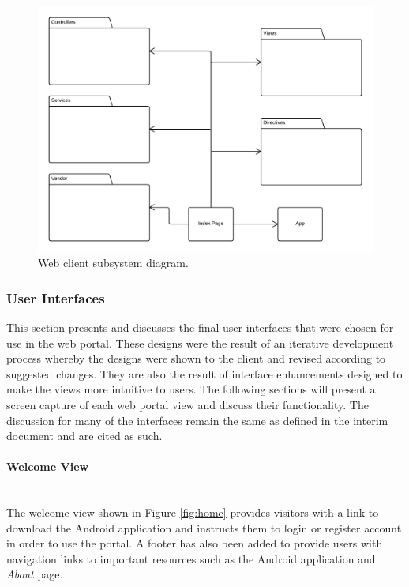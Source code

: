 \documentclass[11pt,a4paper]{report}
\begin{document}
\begin{figure}[H]
\centering
\includegraphics[width=0.8\linewidth]{./img/web-client-uml/subsystem-diagram}
\caption{Web client subsystem diagram.}
\label{fig:subsystem-diagram}
\end{figure}



\subsubsection{User Interfaces}
\label{sec:portal-user-interfaces}

This section presents and discusses the final user interfaces that were chosen for use in the web portal. These designs were the result of an iterative development process whereby the designs were shown to the client and revised according to suggested changes. They are also the result of interface enhancements designed to make the views more intuitive to users. The following sections will present a screen capture of each web portal view and discuss their functionality. The discussion for many of the interfaces remain the same as defined in the interim document and are cited as such.

\paragraph{Welcome View}\mbox{}\\
The welcome view shown in Figure \ref{fig:home} provides visitors with a link to download the Android application and instructs them to login or register account in order to use the portal. A footer has also been added to provide users with navigation links to important resources such as the Android application and \emph{About} page\cite{milestone2}.
\end{document}
